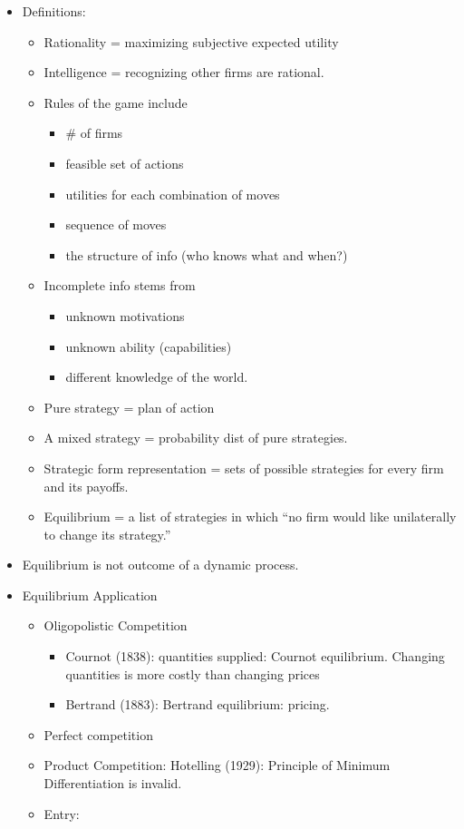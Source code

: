 \documentclass[
]{book}
\begin{document}
\citep{moorthy1985}

\begin{itemize}
\item
  Definitions:

  \begin{itemize}
  \item
    Rationality = maximizing subjective expected utility
  \item
    Intelligence = recognizing other firms are rational.
  \item
    Rules of the game include

    \begin{itemize}
    \item
      \# of firms
    \item
      feasible set of actions
    \item
      utilities for each combination of moves
    \item
      sequence of moves
    \item
      the structure of info (who knows what and when?)
    \end{itemize}
  \item
    Incomplete info stems from

    \begin{itemize}
    \item
      unknown motivations
    \item
      unknown ability (capabilities)
    \item
      different knowledge of the world.
    \end{itemize}
  \item
    Pure strategy = plan of action
  \item
    A mixed strategy = probability dist of pure strategies.
  \item
    Strategic form representation = sets of possible strategies for every firm and its payoffs.
  \item
    Equilibrium = a list of strategies in which ``no firm would like unilaterally to change its strategy.''
  \end{itemize}
\item
  Equilibrium is not outcome of a dynamic process.
\item
  Equilibrium Application

  \begin{itemize}
  \item
    Oligopolistic Competition

    \begin{itemize}
    \item
      Cournot (1838): quantities supplied: Cournot equilibrium. Changing quantities is more costly than changing prices
    \item
      Bertrand (1883): Bertrand equilibrium: pricing.
    \end{itemize}
  \item
    Perfect competition
  \item
    Product Competition: Hotelling (1929): Principle of Minimum Differentiation is invalid.
  \item
    Entry:


\end{itemize}
\end{itemize}
\end{document}
